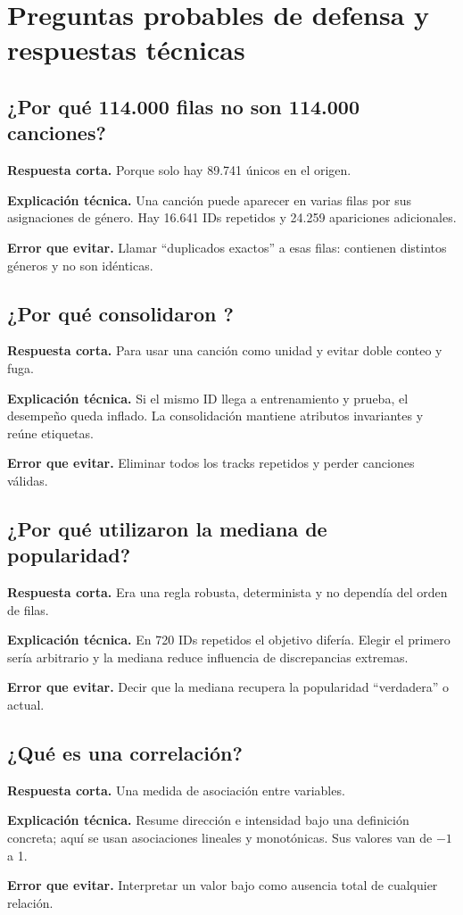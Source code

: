 \section{Preguntas probables de defensa y respuestas técnicas}

\subsection*{¿Por qué 114.000 filas no son 114.000 canciones?}
\textbf{Respuesta corta.} Porque solo hay 89.741  únicos en el origen.\par
\textbf{Explicación técnica.} Una canción puede aparecer en varias filas por sus asignaciones de
género. Hay 16.641 IDs repetidos y 24.259 apariciones adicionales.\par
\textbf{Error que evitar.} Llamar ``duplicados exactos'' a esas filas: contienen distintos géneros y
no son idénticas.

\subsection*{¿Por qué consolidaron ?}
\textbf{Respuesta corta.} Para usar una canción como unidad y evitar doble conteo y fuga.\par
\textbf{Explicación técnica.} Si el mismo ID llega a entrenamiento y prueba, el desempeño queda
inflado. La consolidación mantiene atributos invariantes y reúne etiquetas.\par
\textbf{Error que evitar.} Eliminar todos los tracks repetidos y perder canciones válidas.

\subsection*{¿Por qué utilizaron la mediana de popularidad?}
\textbf{Respuesta corta.} Era una regla robusta, determinista y no dependía del orden de filas.\par
\textbf{Explicación técnica.} En 720 IDs repetidos el objetivo difería. Elegir el primero sería
arbitrario y la mediana reduce influencia de discrepancias extremas.\par
\textbf{Error que evitar.} Decir que la mediana recupera la popularidad ``verdadera'' o actual.

\subsection*{¿Qué es una correlación?}
\textbf{Respuesta corta.} Una medida de asociación entre variables.\par
\textbf{Explicación técnica.} Resume dirección e intensidad bajo una definición concreta; aquí se
usan asociaciones lineales y monotónicas. Sus valores van de $-1$ a 1.\par
\textbf{Error que evitar.} Interpretar un valor bajo como ausencia total de cualquier relación.

